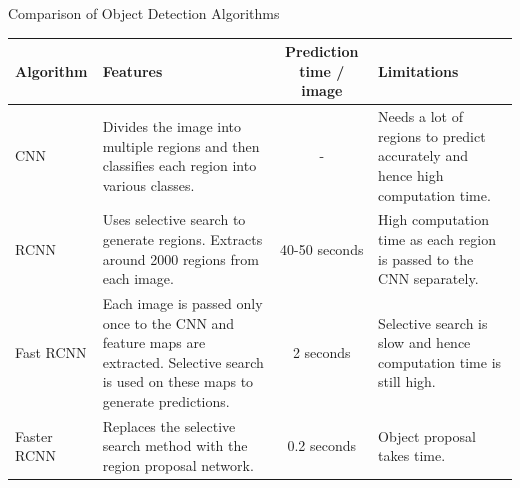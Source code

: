 \documentclass[aspectratio=169]{beamer}
\begin{document}
\begin{frame}{Comparison of Object Detection Algorithms}
	\centering
	\scriptsize
	\renewcommand{\arraystretch}{1.5}
	\begin{tabularx}{\textwidth}{|l|X|c|X|}
		\hline
		\textbf{Algorithm}   & \textbf{Features}                                                                                                                                                                                & \textbf{Prediction time / image} & \textbf{Limitations}                                                                                                                                                                 \\ \hline
		CNN                  & Divides the image into multiple regions and then classifies each region into various classes.                                                                                                    & -                                & Needs a lot of regions to predict accurately and hence high computation time.                                                                                                        \\ \hline
		RCNN                 & Uses selective search to generate regions. Extracts around 2000 regions from each image.                                                                                                         & 40-50 seconds                    & High computation time as each region is passed to the CNN separately.                                                     \\ \hline
		Fast RCNN            & Each image is passed only once to the CNN and feature maps are extracted. Selective search is used on these maps to generate predictions. & 2 seconds                        & Selective search is slow and hence computation time is still high.                                                                                                                   \\ \hline
		Faster RCNN          & Replaces the selective search method with the region proposal network.                                                                                      & 0.2 seconds                      & Object proposal takes time.                                                                                                                                                            \\ \hline
	\end{tabularx}
\end{frame}
\end{document}
